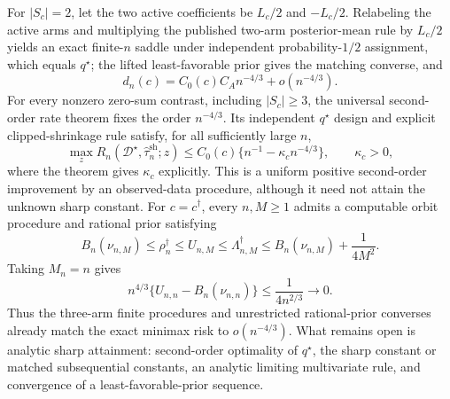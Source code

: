 For \(|S_c|=2\), let the two active coefficients be \(L_c/2\) and \(-L_c/2\). Relabeling the active arms and multiplying the published two-arm posterior-mean rule by \(L_c/2\) yields an exact finite-\(n\) saddle under independent probability-\(1/2\) assignment, which equals \(q^\star\); the lifted least-favorable prior gives the matching converse, and
\[
 d_n(c)=C_0(c)C_A n^{-4/3}+o(n^{-4/3}).
\]
For every nonzero zero-sum contrast, including \(|S_c|\geq3\), the universal second-order rate theorem fixes the order \(n^{-4/3}\). Its independent \(q^\star\) design and explicit clipped-shrinkage rule satisfy, for all sufficiently large \(n\),
\[
 \max_z R_n(\mathcal D^\star,\widehat\tau_n^{\mathrm{sh}};z)
 \leq C_0(c)\{n^{-1}-\kappa_c n^{-4/3}\},
 \qquad \kappa_c>0,
\]
where the theorem gives \(\kappa_c\) explicitly. This is a uniform positive second-order improvement by an observed-data procedure, although it need not attain the unknown sharp constant. For \(c=c^\dagger\), every \(n,M\geq1\) admits a computable orbit procedure and rational prior satisfying
\[
 B_n(\nu_{n,M})\leq\rho_n^\dagger\leq U_{n,M}
 \leq\Lambda_{n,M}^\dagger
 \leq B_n(\nu_{n,M})+\frac{1}{4M^2}.
\]
Taking \(M_n=n\) gives
\[
 n^{4/3}\{U_{n,n}-B_n(\nu_{n,n})\}
 \leq\frac{1}{4n^{2/3}}\longrightarrow0.
\]
Thus the three-arm finite procedures and unrestricted rational-prior converses already match the exact minimax risk to \(o(n^{-4/3})\). What remains open is analytic sharp attainment: second-order optimality of \(q^\star\), the sharp constant or matched subsequential constants, an analytic limiting multivariate rule, and convergence of a least-favorable-prior sequence.